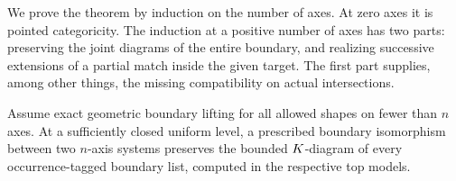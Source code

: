 We prove the theorem by induction on the number of axes.  At zero axes
it is pointed categoricity.  The induction at a positive number of
axes has two parts: preserving the joint diagrams of the entire
boundary, and realizing successive extensions of a partial match
inside the given target.  The first part supplies, among other
things, the missing compatibility on actual intersections.

\begin{lemma}
\label{exact:joint-boundary}
Assume exact geometric boundary lifting for all allowed shapes on
fewer than $n$ axes.  At a sufficiently closed uniform level, a
prescribed boundary isomorphism between two $n$-axis systems preserves
the bounded $K$-diagram of every occurrence-tagged boundary list,
computed in the respective top models.
\end{lemma}

